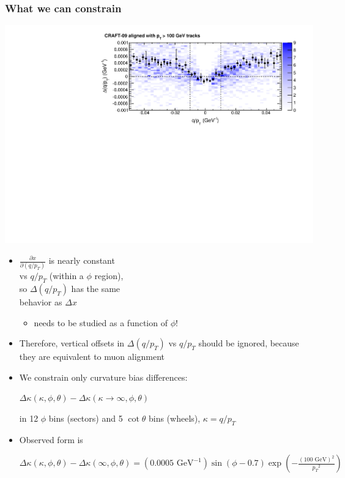 \documentclass[compress]{beamer}
\begin{document}
\begin{frame}
\frametitle{What we can constrain}

\hfill \includegraphics[width=0.5\linewidth]{curvature_real.pdf}

\vspace{-2.3 cm}
\begin{itemize}
\item $\frac{\partial x}{\partial (q/p_T)}$ is nearly 
  constant \\ vs $q/p_T$ (within a $\phi$ region), \\ so $\Delta(q/p_T)$ has
  the same \\ behavior as $\Delta x$
\begin{itemize}
\item needs to be studied as a function of $\phi$!
\end{itemize}

\item Therefore, vertical offsets in $\Delta(q/p_T)$ vs $q/p_T$ should
  be ignored, because they are equivalent to muon alignment

\item We constrain only curvature bias differences:
\begin{center}
$\Delta \kappa(\kappa, \phi, \theta) - \Delta \kappa(\kappa \to \infty, \phi, \theta)$
\end{center}
in 12 $\phi$ bins (sectors) and 5 $\cot\theta$ bins (wheels), $\kappa = q/p_T$

\item Observed form is

{\hspace{-1 cm}\begin{minipage}{1.15\linewidth}
$\displaystyle \Delta \kappa(\kappa, \phi, \theta) - \Delta \kappa(\infty, \phi, \theta) = (0.0005\mbox{ GeV}^{-1}) \sin(\phi - 0.7) \exp\left(-\frac{(100\mbox{ GeV})^2}{{p_T}^2}\right)$
\end{minipage}\mbox{\hspace{-3 cm}}}

\end{itemize}
\end{frame}
\end{document}
